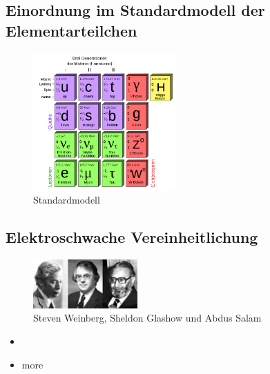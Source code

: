 \subsection{Einordnung im Standardmodell der Elementarteilchen}

\begin{iframe}
	\begin{figure}
		\centering
		\includegraphics[width=5.5cm]{img/standardmodel}
		\caption*{Standardmodell\cite{standardmodel}}
	\end{figure}
\end{iframe}


\subsection{Elektroschwache Vereinheitlichung}
\begin{iframe}

	\begin{figure}
		\includegraphics[width=4cm]{img/weinberg_glasgow_salam}
		\caption*{Steven Weinberg, Sheldon Glashow und Abdus Salam\cite{GSW}}
	\end{figure}
	\begin{itemize}
		\item
	\item more
	\end{itemize}
\end{iframe}

